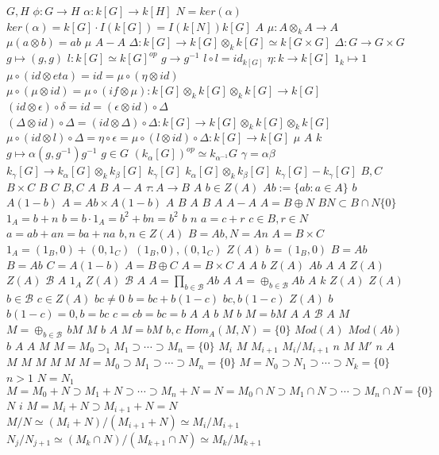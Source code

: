 \documentclass{article}
\begin{document}
$G,H$
$\phi:G \rightarrow H$
$\alpha:k[G] \rightarrow k[H]$
$N=ker(\alpha)$
$ker(\alpha)=k[G] \cdot I(k[G])=I(k[N])k[G]$
$A$
$\mu:A \otimes_k A \rightarrow A$
$\mu(a \otimes b)=ab$
$\mu$
$A-A$
$\Delta:k[G] \rightarrow k[G] \otimes_k k[G] \simeq k[G \times G]$
$\Delta:G \rightarrow G \times G$
$g \mapsto (g,g)$
$l:k[G] \simeq k[G]^{op}$
$g \rightarrow g^{-1}$
$l \circ l =id_{k[G]}$
$\eta:k \rightarrow k[G]$
$1_k \mapsto 1$
$\mu \circ (id \otimes eta)=id=\mu \circ (\eta \otimes id)$
$\mu \circ (\mu \otimes id)=\mu \circ (if \otimes \mu):k[G] \otimes_k k[G] \otimes_k k[G] \rightarrow k[G]$
$(id \otimes \epsilon) \circ \delta = id = (\epsilon \otimes id) \circ \Delta$
$(\Delta \otimes id) \circ \Delta = (id \otimes \Delta) \circ \Delta: k[G] \rightarrow k[G] \otimes_k k[G] \otimes_k k[G]$
$\mu \circ (id \otimes l) \circ \Delta=\eta \circ \epsilon=\mu \circ (l \otimes id) \circ \Delta:k[G] \rightarrow k[G]$
$\mu$
$A$
$k$
$g \mapsto \alpha(g,g^{-1})g^{-1}$
$g \in G$
$(k_\alpha[G])^{op} \simeq k_{\alpha^{-1}}G$
$\gamma=\alpha\beta$
$k_\gamma[G] \rightarrow k_\alpha[G] \otimes_k k_\beta[G]$
$k_\gamma[G]$
$k_\alpha[G] \otimes_k k_\beta[G]$
$k_\gamma[G]-k_\gamma[G]$
$B,C$
$B \times C$
$B$
$C$
$B,C$
$A$
$B$
$A-A$
$\tau:A \rightarrow B$
$A$
$b \in Z(A)$
$Ab:=\{ab:a \in A\}$
$b$
$A(1-b)$
$A=Ab \times A(1-b)$
$A$
$B$
$A$
$B$
$A$
$A-A$
$A=B \oplus N$
$BN \subset B \cap N \{0\}$
$1_A=b+n$
$b=b \cdot 1_A=b^2+bn=b^2$
$b$
$n$
$a=c+r$
$c \in B,r \in N$
$a=ab+an=ba+na$
$b,n \in Z(A)$
$B=Ab,N=An$
$A=B \times C$
$1_A=(1_B,0)+(0,1_C)$
$(1_B,0),(0,1_C)$
$Z(A)$
$b=(1_B,0)$
$B=Ab$
$B=Ab$
$C=A(1-b)$
$A=B \oplus C$
$A=B \times C$
$A$
$A$
$b$
$Z(A)$
$Ab$
$A$
$A$
$Z(A)$
$Z(A)$
$\mathcal{B}$
$A$
$1_A$
$Z(A)$
$\mathcal{B}$
$A$
$A=\prod_{b \in \mathcal{B}} Ab$
$A$
$A=\oplus_{b \in \mathcal{B}}Ab$
$A$
$k$
$Z(A)$
$Z(A)$
$b \in \mathcal{B}$
$c \in Z(A)$
$bc \neq 0$
$b=bc+b(1-c)$
$bc,b(1-c)$
$Z(A)$
$b$
$b(1-c)=0,b=bc$
$c=cb=bc=b$
$A$
$A$
$b$
$M$
$b$
$M=bM$
$A$
$A$
$\mathcal{B}$
$A$
$M$
$M=\oplus_{b \in \mathcal{B}}\,bM$
$M$
$b$
$A$
$M=bM$
$b,c$
$Hom_A(M,N)=\{0\}$
$Mod(A)$
$Mod(Ab)$
$b$
$A$
$A$
$M$
$M= M_0 \supset_1 M_1 \supset \cdots \supset M_n=\{0\}$
$M_i$
$M$
$M_{i+1}$
$M_i/M_{i+1}$
$n$
$M$
$M'$
$n$
$A$
$M$
$M$
$M$
$M$
$M$
$M=M_0 \supset M_1 \supset \cdots \supset M_n=\{0\}$
$M=N_0 \supset N_1 \supset \cdots \supset N_k=\{0\}$
$n >1$
$N=N_1$
$$
M=M_0+N \supset M_1+N \supset \cdots \supset M_n+N=N=M_0 \cap N \supset M_1 \cap N \supset \cdots \supset M_n \cap N=\{0\}
$$
$N$
$i$
$M=M_i+N \supset M_{i+1}+N=N$
$M/N \simeq (M_i+N)/(M_{i+1}+N) \simeq M_i/M_{i+1}$
$N_j/N_{j+1} \simeq (M_k \cap N)/(M_{k+1} \cap N) \simeq M_k/M_{k+1}$
\end{document}
